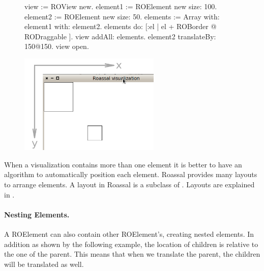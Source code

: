 \documentclass[a4paper,10pt,twoside]{book}
\begin{document}
\begin{figure}[H]
      \begin{minipage}[t]{0.5\textwidth}
      \vspace{0pt}
\begin{code}{}
view := ROView new.
element1 := ROElement new size: 100.
element2 := ROElement new size: 50.
elements := Array with: element1 with: element2.
elements do: [:el | el + ROBorder @ RODraggable ].
view addAll: elements.
element2 translateBy: 150@150.
view open.
\end{code}
   \end{minipage}
   \hfill
   \begin{minipage}[t]{0.6\textwidth}
      \vspace{0pt} \raggedright
       \centering
		\includegraphics[width=0.6\textwidth]{ex4}
   \end{minipage}
\label{fig:ex4}
\end{figure}


When a visualization contains more than one element it is better to have an algorithm to automatically position each element. Roassal provides many layouts to arrange elements. A layout in Roassal is a subclass of . Layouts are explained in .


\paragraph{Nesting Elements.}
A ROElement can also contain other ROElement's, creating nested elements. In addition as shown by the following example, the location of children is relative to the one of the parent. This means that when we translate the parent, the children will be translated as well. %
\end{document}
